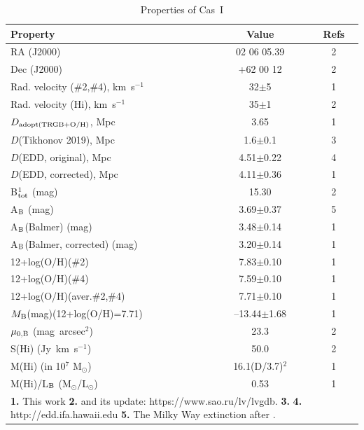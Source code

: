 \documentclass[useAMS,usenatbib]{mn2e}
\newcommand{\kms}{km~s$^{-1}$}
\newcommand{\HI}{H{\sc i}}
\newcommand{\sunn}{$_{\odot}$}
\begin{document}
\begin{table}
\caption{Properties of Cas~I}
\begin{tabular}{lcc}
\hline
Property                             & Value         & Refs          \\
\hline
RA (J2000)                           & 02 06 05.39   & 2            \\
Dec (J2000)                          & +62 00 12     & 2             \\
Rad. velocity ($\#$2,$\#$4), \kms\   & 32$\pm$5      & 1             \\
Rad. velocity (\HI), \kms\           & 35$\pm$1      & 2             \\
$D_{\rm adopt(TRGB+O/H)}$, Mpc       & 3.65           & 1             \\
$D$(Tikhonov 2019), Mpc              & 1.6$\pm$0.1   & 3             \\
$D$(EDD, original), Mpc              & 4.51$\pm$0.22  & 4          \\
$D$(EDD, corrected), Mpc             & 4.11$\pm$0.36   & 1        \\
B$_{\rm tot}^1$ (mag)                & 15.30         & 2             \\
A$_{\rm B}$ (mag)                    & 3.69$\pm$0.37 & 5             \\
A$_{\rm B}$(Balmer) (mag)            & 3.48$\pm$0.14 & 1             \\
A$_{\rm B}$(Balmer, corrected) (mag) & 3.20$\pm$0.14 & 1             \\
12+log(O/H)($\#$2)                  & 7.83$\pm$0.10 & 1             \\
12+log(O/H)($\#$4)                  & 7.59$\pm$0.10 & 1             \\
12+log(O/H)(aver.$\#$2,$\#$4)        & 7.71$\pm$0.10 & 1             \\
$M_{\rm B}$(mag)(12+log(O/H)=7.71) &--13.44$\pm$1.68& 1       \\
$\mu_{\rm 0,B}$ (mag~arcsec$^2$)     & 23.3          & 2             \\
S(\HI) (Jy~\kms)                     & 50.0          & 2             \\
M(\HI) (in 10$^7$ M\sunn)            & 16.1(D/3.7)$^2$& 1             \\
M(\HI)/L$_{\rm B}$ (M\sunn/L\sunn)   & 0.53          & 1             \\
\hline
\multicolumn{3}{p{7.0cm}}{
{\bf 1.} This work
{\bf 2.} \citet{UNGC} and its update: \mbox{https://www.sao.ru/lv/lvgdb}.
{\bf 3.} \citet{Tikhonov19}
{\bf 4.} \mbox{http://edd.ifa.hawaii.edu}
{\bf 5.} The Milky Way extinction after \citet{Schlafly11}.
}
\end{tabular}
\label{tab:parameters}
\end{table}
\end{document}
